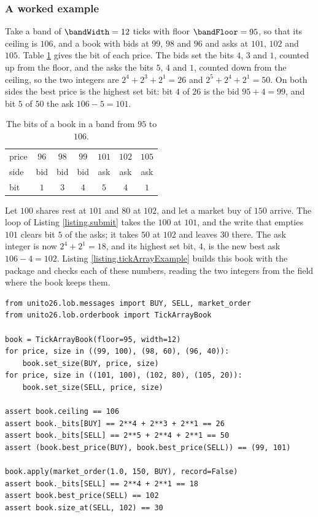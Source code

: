 \subsubsection{A worked example}

Take a band of $\bandWidth = 12$ ticks with floor $\bandFloor = 95$, so that its ceiling is
$106$,
and a book with bids at $99$, $98$ and $96$ and asks at $101$, $102$ and $105$.
Table \ref{tab.tickArrayExample} gives the bit of each price.
The bids set the bits $4$, $3$ and $1$, counted up from the floor,
and the asks the bits $5$, $4$ and $1$, counted down from the ceiling,
so the two integers are $2^4 + 2^3 + 2^1 = 26$ and $2^5 + 2^4 + 2^1 = 50$.
On both sides the best price is the highest set bit:
bit $4$ of $26$ is the bid $95 + 4 = 99$,
and bit $5$ of $50$ the ask $106 - 5 = 101$.

\begin{table}[h!]
 \centering
 \begin{tabular}{@{}lcccccc@{}}
  \toprule
  price & $96$ & $98$ & $99$ & $101$ & $102$ & $105$ \\
  side & bid & bid & bid & ask & ask & ask \\
  bit & $1$ & $3$ & $4$ & $5$ & $4$ & $1$ \\
  \bottomrule
 \end{tabular}
 \caption{The bits of a book in a band from $95$ to $106$.}
 \label{tab.tickArrayExample}
\end{table}

Let $100$ shares rest at $101$ and $80$ at $102$, and let a market buy of $150$ arrive.
The loop of Listing \ref{listing.submit} takes the $100$ at $101$,
and the write that empties $101$ clears bit $5$ of the asks;
it takes $50$ at $102$ and leaves $30$ there.
The ask integer is now $2^4 + 2^1 = 18$,
and its highest set bit, $4$, is the new best ask $106 - 4 = 102$.
Listing \ref{listing.tickArrayExample} builds this book with the package
and checks each of these numbers,
reading the two integers from the field  where the book keeps them.

\begin{lstlisting}[caption={The worked example, built and checked.}, label=listing.tickArrayExample]
from unito26.lob.messages import BUY, SELL, market_order
from unito26.lob.orderbook import TickArrayBook

book = TickArrayBook(floor=95, width=12)
for price, size in ((99, 100), (98, 60), (96, 40)):
    book.set_size(BUY, price, size)
for price, size in ((101, 100), (102, 80), (105, 20)):
    book.set_size(SELL, price, size)

assert book.ceiling == 106
assert book._bits[BUY] == 2**4 + 2**3 + 2**1 == 26
assert book._bits[SELL] == 2**5 + 2**4 + 2**1 == 50
assert (book.best_price(BUY), book.best_price(SELL)) == (99, 101)

book.apply(market_order(1.0, 150, BUY), record=False)
assert book._bits[SELL] == 2**4 + 2**1 == 18
assert book.best_price(SELL) == 102
assert book.size_at(SELL, 102) == 30
\end{lstlisting}

